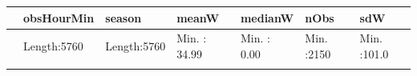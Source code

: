 \documentclass[]{article}
\begin{document}
\begin{longtable}[]{@{}lllllll@{}}
\toprule
\begin{minipage}[b]{0.03\columnwidth}\raggedright\strut
\strut
\end{minipage} & \begin{minipage}[b]{0.14\columnwidth}\raggedright\strut
obsHourMin\strut
\end{minipage} & \begin{minipage}[b]{0.15\columnwidth}\raggedright\strut
season\strut
\end{minipage} & \begin{minipage}[b]{0.13\columnwidth}\raggedright\strut
meanW\strut
\end{minipage} & \begin{minipage}[b]{0.13\columnwidth}\raggedright\strut
medianW\strut
\end{minipage} & \begin{minipage}[b]{0.11\columnwidth}\raggedright\strut
nObs\strut
\end{minipage} & \begin{minipage}[b]{0.12\columnwidth}\raggedright\strut
sdW\strut
\end{minipage}\tabularnewline
\midrule
\endhead
\begin{minipage}[t]{0.03\columnwidth}\raggedright\strut
\strut
\end{minipage} & \begin{minipage}[t]{0.14\columnwidth}\raggedright\strut
Length:5760\strut
\end{minipage} & \begin{minipage}[t]{0.15\columnwidth}\raggedright\strut
Length:5760\strut
\end{minipage} & \begin{minipage}[t]{0.13\columnwidth}\raggedright\strut
Min. : 34.99\strut
\end{minipage} & \begin{minipage}[t]{0.13\columnwidth}\raggedright\strut
Min. : 0.00\strut
\end{minipage} & \begin{minipage}[t]{0.11\columnwidth}\raggedright\strut
Min. :2150\strut
\end{minipage} & \begin{minipage}[t]{0.12\columnwidth}\raggedright\strut
Min. :101.0\strut
\end{minipage}\tabularnewline
\begin{minipage}[t]{0.03\columnwidth}\raggedright\strut
\strut
\end{minipage} & \begin{minipage}[t]{0.14\columnwidth}\raggedright\strut

\end{minipage}
\end{longtable}
\end{document}
